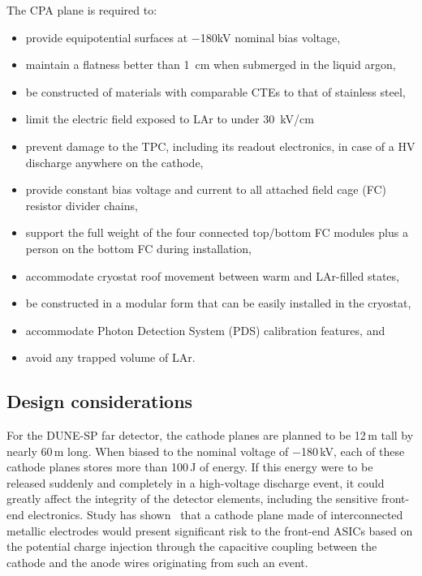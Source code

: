 The CPA plane is required to:
\begin{itemize}
\item provide equipotential surfaces at $-$180kV nominal bias voltage,
\item maintain a flatness better than 1~cm when submerged in the liquid argon,
\item be constructed of materials with comparable CTEs to that of stainless steel, 
\item limit the electric field exposed to LAr to under 30~kV/cm 
\item prevent damage to the TPC, including its readout electronics, in case of a HV discharge anywhere on the cathode,
\item provide constant bias voltage and current to all attached field cage (FC) resistor divider chains,
\item support the full weight of the four connected top/bottom FC modules plus a person on the bottom FC during installation,
\item accommodate cryostat roof movement between warm and LAr-filled states,
\item be constructed in a modular form that can be easily installed in the cryostat,
\item accommodate Photon Detection System (PDS) calibration features, and
\item avoid any trapped volume of LAr.
\end{itemize}

\subsection{Design considerations}


For the DUNE-SP far detector, the cathode planes are planned to be 12\,m tall by nearly 60\,m long.  When biased to the nominal voltage of $-$180\,kV, each of these cathode planes stores more than 100\,J of energy. If this energy were to be released  suddenly and completely in a high-voltage discharge event, it could greatly affect the integrity of the detector elements, including the sensitive front-end electronics.  
Study has shown~\cite{cathode-hv-1320} that a cathode plane made of interconnected metallic electrodes would present significant risk to the front-end ASICs based on the potential charge injection through the capacitive coupling between the cathode and the anode wires originating from such an event.  

